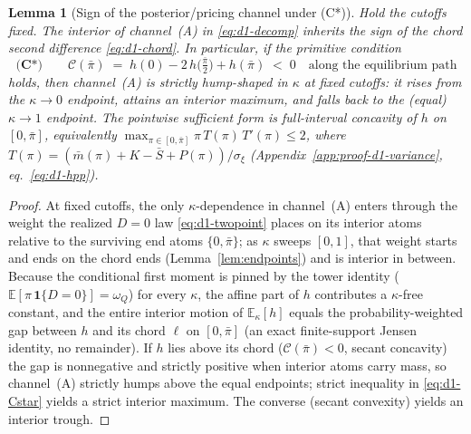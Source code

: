 \documentclass[11pt]{article}
\newtheorem{lemma}{Lemma}
\newcommand{\E}{\mathbb{E}}
\newcommand{\1}{\mathbf{1}}
\begin{document}
\begin{lemma}[Sign of the posterior/pricing channel under (C*)]
\label{lem:d1-jensen}
Hold the cutoffs fixed. The interior of channel~(A) in \eqref{eq:d1-decomp}
inherits the sign of the chord second difference \eqref{eq:d1-chord}. In
particular, if the primitive condition
\begin{equation}
  \textbf{(C*)}\qquad
  \mathcal{C}(\bar\pi)
  \;=\;
  h(0)-2\,h\!\big(\tfrac{\bar\pi}{2}\big)+h(\bar\pi)
  \;<\;0
  \quad\text{along the equilibrium path}
  \label{eq:d1-Cstar}
\end{equation}
holds, then channel~(A) is strictly hump-shaped in $\kappa$ at fixed cutoffs: it
rises from the $\kappa\to0$ endpoint, attains an interior maximum, and falls back
to the (equal) $\kappa\to1$ endpoint. The pointwise sufficient form is
full-interval concavity of $h$ on $[0,\bar\pi]$, equivalently
$\max_{\pi\in[0,\bar\pi]}\pi\,T(\pi)\,T'(\pi)\le 2$, where
$T(\pi)=(\bar m(\pi)+K-\bar S+P(\pi))/\sigma_\xi$
(Appendix~\ref{app:proof-d1-variance}, eq.~\eqref{eq:d1-hpp}).
\end{lemma}

\begin{proof}
At fixed cutoffs, the only $\kappa$-dependence in channel~(A) enters through the
weight the realized $D=0$ law \eqref{eq:d1-twopoint} places on its interior atoms
relative to the surviving end atoms $\{0,\bar\pi\}$; as $\kappa$ sweeps $[0,1]$,
that weight starts and ends on the chord ends (Lemma~\ref{lem:endpoints}) and is
interior in between. Because the conditional first moment is pinned by the tower
identity ($\E[\pi\,\1\{D=0\}]=\omega_Q$) for every $\kappa$, the affine part of
$h$ contributes a $\kappa$-free constant, and the entire interior motion of
$\E_\kappa[h]$ equals the probability-weighted gap between $h$ and its chord
$\ell$ on $[0,\bar\pi]$ (an exact finite-support Jensen identity, no remainder).
If $h$ lies above its chord ($\mathcal{C}(\bar\pi)<0$, secant concavity) the gap
is nonnegative and strictly positive when interior atoms carry mass, so
channel~(A) strictly humps above the equal endpoints; strict inequality in
\eqref{eq:d1-Cstar} yields a strict interior maximum. The converse (secant
convexity) yields an interior trough.
\end{proof}
\end{document}
